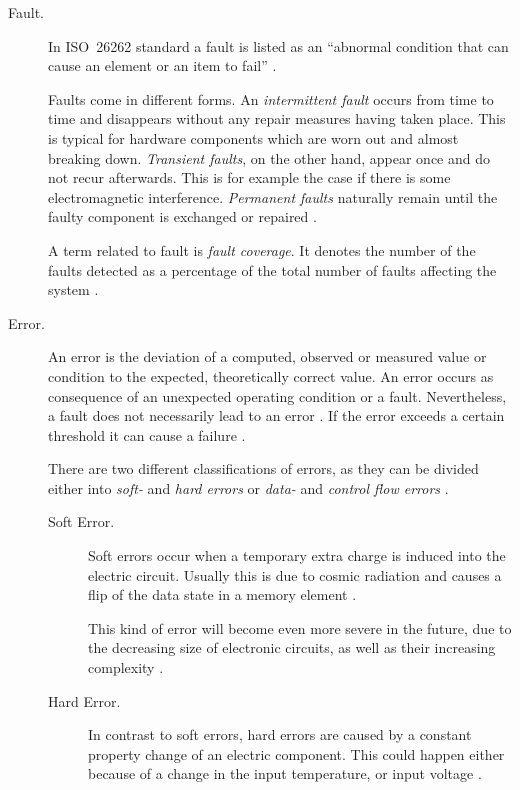 \begin{description}
\item [Fault.]
In \mbox{ISO 26262} standard a fault is listed as an ``abnormal condition that can cause an element or an item to fail'' \cite{iso26262:1} \cite{autosar_glossary}. 

Faults come in different forms. An \emph{intermittent fault} occurs from time to time and disappears without any repair measures having taken place. This is typical for hardware components which are worn out and almost breaking down. \emph{Transient faults}, on the other hand, appear once and do not recur afterwards. This is for example the case if there is some electromagnetic interference. \emph{Permanent faults} naturally remain until the faulty component is exchanged or repaired \cite{iso26262:1}.

A term related to fault is \emph{fault coverage}. It denotes the number of the faults detected as a percentage of the total number of faults affecting the system \cite{elattar2007}.

\item [Error.]
An error is the deviation of a computed, observed or measured value or condition to the expected, theoretically correct value. An error occurs as consequence of an unexpected operating condition or a fault. Nevertheless, a fault does not necessarily lead to an error \cite{iso26262:1} \cite{nelson} \cite{autosar_glossary}. If the error exceeds a certain threshold it can cause a failure \cite{autosar_glossary}.

There are two different classifications of errors, as they can be divided either into \emph{soft-} and \emph{hard errors} or \emph{data-} and \emph{control flow errors} \cite{israr2014} \cite{elattar2007}.

\begin{description}
\item [Soft Error.]
Soft errors occur when a temporary extra charge is induced into the electric circuit. Usually this is due to cosmic radiation and causes a flip of the data state in a memory element \cite{israr2014} \cite{elattar2007}.

This kind of error will become even more severe in the future, due to the decreasing size of electronic circuits, as well as their increasing complexity \cite{elattar2007}.

\item [Hard Error.]
In contrast to soft errors, hard errors are caused by a constant property change of an electric component. This could happen either because of a change in the input temperature, or input voltage \cite{israr2014}.
\end{description}


\end{description}
